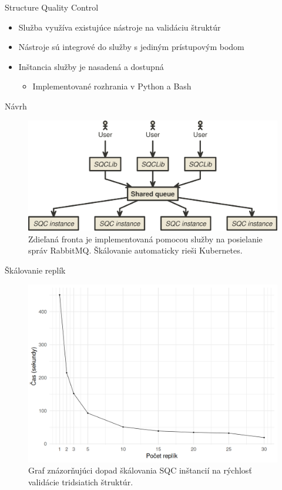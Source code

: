\documentclass[
  aspectratio=169,
]{beamer}
\begin{document}
\begin{frame}{Structure Quality Control}
\begin{itemize}
  \item Služba využíva existujúce nástroje na validáciu štruktúr
  \item Nástroje sú integrové do služby s jediným prístupovým bodom
  \item Inštancia služby je nasadená a dostupná
  \begin{itemize}
    \item Implementované rozhrania v Python a Bash
  \end{itemize}
\end{itemize}
\end{frame}

\begin{frame}{Návrh}
\begin{figure}
  \includegraphics[width=.8\textwidth,height=.8\textheight,keepaspectratio]{img/diagram.png}
  \caption{Zdieľaná fronta je implementovaná pomocou služby na posielanie správ RabbitMQ. Škálovanie automaticky rieši Kubernetes.}
\end{figure}
\end{frame}

\begin{frame}{Škálovanie replík}
\begin{figure}
  \includegraphics[width=.8\textwidth,height=.8\textheight,keepaspectratio]{img/replica-perf.png}
  \caption{Graf znázorňujúci dopad škálovania SQC inštancií na rýchlosť validácie tridsiatich štruktúr.}
\end{figure}
\end{frame}
\end{document}
